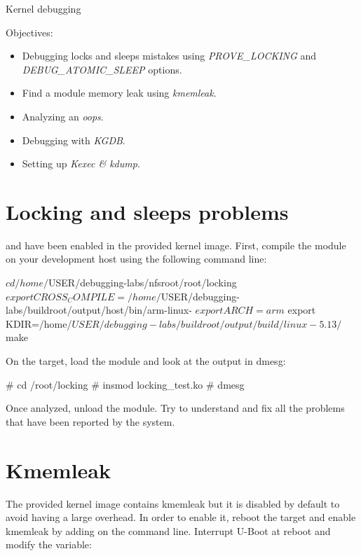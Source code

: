 \subchapter
{Kernel debugging}
{Objectives:
  \begin{itemize}
    \item Debugging locks and sleeps mistakes using {\em PROVE\_LOCKING} and {\em
    DEBUG\_ATOMIC\_SLEEP} options.
    \item Find a module memory leak using {\em kmemleak}.
    \item Analyzing an {\em oops}.
    \item Debugging with {\em KGDB}.
    \item Setting up {\em Kexec \& kdump}.
  \end{itemize}
}

\section{Locking and sleeps problems}

 and  have been
enabled in the provided kernel image.
First, compile the module on your development host using the following command line:

\begin{bashinput}
$ cd /home/$USER/debugging-labs/nfsroot/root/locking
$ export CROSS_COMPILE=/home/$USER/debugging-labs/buildroot/output/host/bin/arm-linux-
$ export ARCH=arm
$ export KDIR=/home/$USER/debugging-labs/buildroot/output/build/linux-5.13/
$ make
\end{bashinput}

On the target, load the  module and look at the output in dmesg:

\begin{bashinput}
# cd /root/locking
# insmod locking_test.ko
# dmesg
\end{bashinput}

Once analyzed, unload the module. Try to understand and fix all the problems that
have been reported by the  system.

\section{Kmemleak}

The provided kernel image contains kmemleak but it is disabled by default to
avoid having a large overhead. In order to enable it, reboot the target and enable
kmemleak by adding  on the command line. Interrupt U-Boot at
reboot and modify the  variable:

